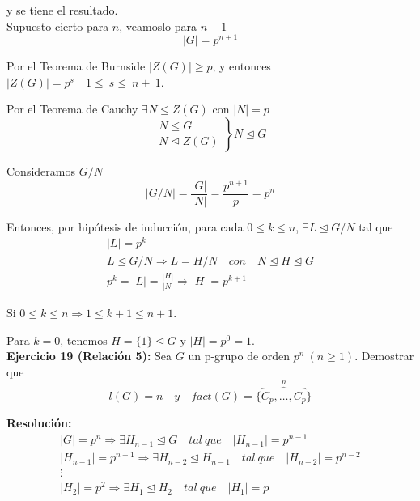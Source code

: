 \documentclass{article}
\begin{document}
y se tiene el resultado. \\

Supuesto cierto para $n$, veamoslo para $n+1$
\begin{equation*}
|G|=p^{n+1}
\end{equation*}

Por el Teorema de Burnside $|Z(G)|\geq p$, y entonces $|Z(G)|=p^s\quad 1\leq~s\leq~n+~1$.

Por el Teorema de Cauchy $\exists N\leq Z(G)$ con $|N|=p$
\begin{equation*}
\left. \begin{array}{c}
N\leq G\\
N\unlhd Z(G)
\end{array}\right\rbrace N\unlhd G
\end{equation*}

Consideramos $G/N$
\begin{equation*}
|G/N|=\frac{|G|}{|N|}=\frac{p^{n+1}}{p}=p^n
\end{equation*}

Entonces, por hipótesis de inducción, para cada $0\leq k\leq n$, $\exists L\unlhd G/N$ tal que
\begin{gather*}
|L|=p^k\\
L\unlhd G/N\Rightarrow L=H/N\quad con\quad N\unlhd H\unlhd G \\
p^k=|L|=\frac{|H|}{|N|}\Rightarrow |H|=p^{k+1}
\end{gather*}

Si $0\leq k\leq n\Rightarrow 1\leq k+1\leq n+1$.

Para $k=0$, tenemos $H=\{1\}\unlhd G$ y $|H|=p^0=1$. \\

\textbf{Ejercicio 19 (Relación 5):} Sea $G$ un p-grupo de orden $p^n\:(n\geq 1)$. Demostrar que
\begin{equation*}
l(G)=n\quad y\quad fact(G)=\{\overbrace{C_p,\ldots,C_p}^n\}
\end{equation*}

\textbf{Resolución:}
\begin{gather*}
|G|=p^n\Rightarrow \exists H_{n-1}\unlhd G\quad tal\:que\quad |H_{n-1}|=p^{n-1} \\
|H_{n-1}|=p^{n-1}\Rightarrow \exists H_{n-2}\unlhd H_{n-1}\quad tal\:que\quad |H_{n-2}|=p^{n-2} \\
\vdots \\
|H_2|=p^2\Rightarrow \exists H_1\unlhd H_2\quad tal\:que\quad |H_1|=p
\end{gather*}
\end{document}
